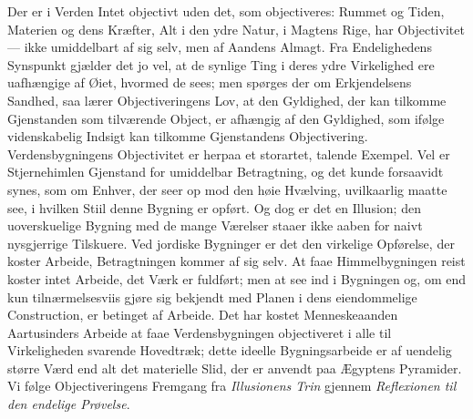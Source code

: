 \documentclass[12pt,a4paper]{book}
\begin{document}
Der er i Verden Intet objectivt uden det, som objectiveres: Rummet og
Tiden, Materien og dens Kræfter, Alt i den ydre Natur, i Magtens Rige,
har Objectivitet --- ikke umiddelbart af sig selv, men af Aandens
Almagt. Fra Endelighedens Synspunkt gjælder det jo vel, at de synlige
Ting i deres ydre Virkelighed ere uafhængige af Øiet, hvormed de sees;
men spørges der om Erkjendelsens Sandhed, saa lærer Objectiveringens
Lov, at den Gyldighed, der kan tilkomme Gjenstanden som tilværende
Object, er afhængig af den Gyldighed, som ifølge videnskabelig Indsigt
kan tilkomme Gjenstandens Objectivering. Verdensbygningens Objectivitet
er herpaa et storartet, talende Exempel. Vel er Stjernehimlen Gjenstand
for umiddelbar Betragtning, og det kunde forsaavidt synes, som om
Enhver, der seer op mod den høie Hvælving, uvilkaarlig maatte see, i
hvilken Stiil denne Bygning er opført. Og dog er det en Illusion; den
uoverskuelige Bygning med de mange Værelser staaer ikke aaben for naivt
nysgjerrige Tilskuere. Ved jordiske Bygninger er det den virkelige
Opførelse, der koster Arbeide, Betragtningen kommer af sig selv. At
faae Himmelbygningen reist koster intet Arbeide, det Værk er fuldført;
men at see ind i Bygningen og, om end kun tilnærmelsesviis gjøre sig
bekjendt med Planen i dens eiendommelige Construction, er betinget af
Arbeide. Det har kostet Menneskeaanden Aartusinders Arbeide at faae
Verdensbygningen objectiveret i alle til Virkeligheden svarende
Hovedtræk; dette ideelle Bygningsarbeide er af uendelig større Værd end
alt det materielle Slid, der er anvendt paa Ægyptens Pyramider. Vi
følge Objectiveringens Fremgang fra \emph{Illusionens Trin} gjennem
\emph{Reflexionen til den endelige Prøvelse}.
\end{document}
